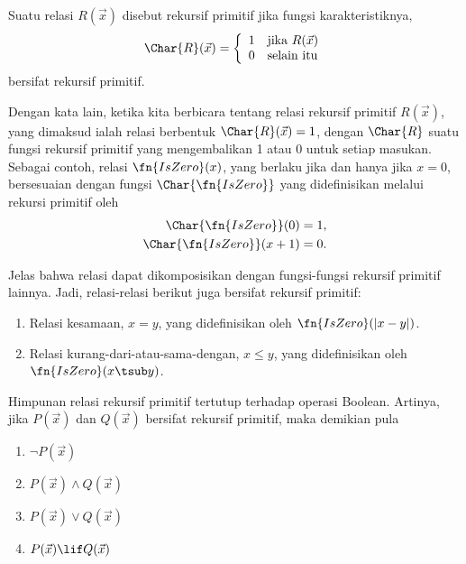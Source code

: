 \documentclass[../../../include/open-logic-section]{subfiles}
\begin{document}


\begin{defn}
Suatu relasi $R(\vec x)$ disebut rekursif primitif jika fungsi
karakteristiknya,
\[
\Char{R}(\vec x) = \left\{
  \begin{array}{ll}
  1 & \mbox{jika $R(\vec x)$} \\
  0 & \mbox{selain itu}
  \end{array}
\right.
\]
bersifat rekursif primitif.
\end{defn}

Dengan kata lain, ketika kita berbicara tentang relasi rekursif primitif
$R(\vec x)$, yang dimaksud ialah relasi berbentuk $\Char{R}(\vec x) = 1$,
dengan $\Char{R}$ suatu fungsi rekursif primitif yang mengembalikan 1 atau
0 untuk setiap masukan. Sebagai contoh, relasi $\fn{IsZero}(x)$, yang
berlaku jika dan hanya jika $x = 0$, bersesuaian dengan fungsi
$\Char{\fn{IsZero}}$ yang didefinisikan melalui rekursi primitif oleh
\begin{align*}
\Char{\fn{IsZero}}(0) & = 1,\\
\Char{\fn{IsZero}}(x+1) & = 0.
\end{align*}

Jelas bahwa relasi dapat dikomposisikan dengan fungsi-fungsi rekursif primitif
lainnya. Jadi, relasi-relasi berikut juga bersifat rekursif primitif:
\begin{enumerate}
\item Relasi kesamaan, $x = y$, yang didefinisikan oleh
  $\fn{IsZero}(\left|x-y\right|)$.
\item Relasi kurang-dari-atau-sama-dengan, $x \leq y$, yang didefinisikan oleh
  $\fn{IsZero}(x \tsub y)$.
\end{enumerate}


\begin{prop}
  Himpunan relasi rekursif primitif tertutup terhadap operasi Boolean. Artinya,
  jika $P(\vec x)$ dan $Q(\vec x)$ bersifat rekursif primitif, maka demikian
  pula
  \begin{enumerate}
  \item $\lnot P(\vec x)$
  \item $P(\vec x) \land Q(\vec x)$
  \item $P(\vec x) \lor Q(\vec x)$
  \item $P(\vec x) \lif Q(\vec x)$
  \end{enumerate}
\end{prop}
\end{document}
